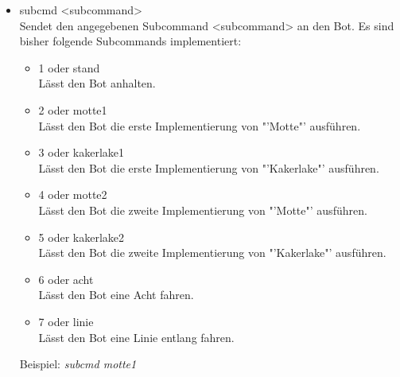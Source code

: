 \begin{itemize}
    \item subcmd <subcommand>\\
    Sendet den angegebenen Subcommand <subcommand> an den Bot. Es sind bisher folgende Subcommands implementiert:
    \begin{itemize}
        \item 1 oder stand\\
        Lässt den Bot anhalten.
        \item 2 oder motte1\\
        Lässt den Bot die erste Implementierung von "'Motte"' ausführen.
        \item 3 oder kakerlake1\\
        Lässt den Bot die erste Implementierung von "'Kakerlake"' ausführen.
        \item 4 oder motte2\\
        Lässt den Bot die zweite Implementierung von "'Motte"' ausführen.
        \item 5 oder kakerlake2\\
        Lässt den Bot die zweite Implementierung von "'Kakerlake"' ausführen.
        \item 6 oder acht\\
        Lässt den Bot eine Acht fahren.
        \item 7 oder linie\\
        Lässt den Bot eine Linie entlang fahren.
    \end{itemize}
    Beispiel: \textit{subcmd motte1}
    

\end{itemize}
